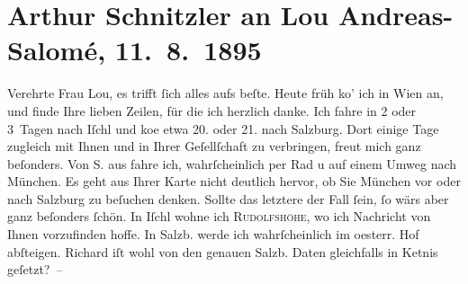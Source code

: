 

               \section[Arthur Schnitzler an Lou Andreas-Salomé, 11. 8. 1895]{ Arthur Schnitzler an Lou Andreas-Salomé,
                    11. 8. 1895}\nopagebreak{}\rehead{ }\begin{ledgroupsized}[t]{13cm}\normalsize\beginnumbering{} \toendnotes[C]{\smallbreak\pagebreak[2]} 
\pstart{}{\pb}Verehrte Frau Lou,\pend\pstart
           es trifft ſich alles aufs beſte. Heute früh ko{\geminationm}’ ich
                    in Wien an, und  finde Ihre lieben Zeilen, für die ich herzlich danke.\pend
           \pstart
           Ich fahre in 2 oder 3 Tagen nach Iſchl
                    und ko{\geminationm}e etwa 20. oder
                        21. nach Salzburg. Dort
                    einige Tage zugleich mit Ihnen und in Ihrer Geſellſchaft zu verbringen, freut
                        {\pb}mich ganz beſonders. Von S. aus fahre ich, wahrſcheinlich per Rad u auf einem
                    Umweg nach München. Es geht aus Ihrer
                    Karte nicht deutlich hervor, ob Sie München vor oder nach Salzburg zu beſuchen denken. Sollte das letztere der Fall ſein,
                    ſo wärs aber ganz beſonders ſchön.\pend
           \pstart
           In Iſchl wohne ich \textsc{Rudolfshöhe}, {\pb}wo ich Nachricht von Ihnen vorzufinden hoffe. In
                        Salzb. werde ich wahrſcheinlich im
                        oesterr. Hof abſteigen. Richard iſt wohl von den genauen Salzb. Daten gleichfalls in Ke{\geminationn}tnis geſetzt? – \pend

\end{ledgroupsized}
